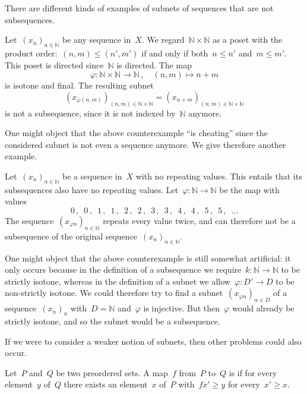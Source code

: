 There are different kinds of examples of subnets of sequences that are not subsequences.
\begin{itemize*}

	\item
		Let~$(x_n)_{n ∈ ℕ}$ be any sequence in~$X$.
		We regard~$ℕ × ℕ$ as a poset with the product order:~$(n, m) ≤ (n', m')$ if and only if both~$n ≤ n'$ and~$m ≤ m'$.
		This poset is directed since~$ℕ$ is directed.
		The map
		\[
			φ \colon ℕ × ℕ \to ℕ \,, \quad (n, m) \mapsto n + m
		\]
		is isotone and final.
		The resulting subnet
		\[
			(x_{φ (n, m)})_{(n, m) ∈ ℕ × ℕ} = (x_{n + m})_{(n, m) ∈ ℕ × ℕ}
		\]
		is not a subsequence, since it is not indexed by~$ℕ$ anymore.

	\item
		One might object that the above counterexample \enquote{is cheating} since the considered subnet is not even a sequence anymore.
		We give therefore another example.

		Let~$(x_n)_{n ∈ ℕ}$ be a sequence in~$X$ with no repeating values.
		This entails that its subsequences also have no repeating values.
		Let~$φ \colon ℕ \to ℕ$ be the map with values
		\[
			0 \,, \enspace 0 \,, \enspace
			1 \,, \enspace 1 \,, \enspace
			2 \,, \enspace 2 \,, \enspace
			3 \,, \enspace 3 \,, \enspace
			4 \,, \enspace 4 \,, \enspace
			5 \,, \enspace 5 \,, \enspace
			\dotsc
		\]
		The sequence~$(x_{φ n})_{n ∈ ℕ}$ repeats every value twice, and can therefore not be a subsequence of the original sequence~$(x_n)_{n ∈ ℕ}$.

	\item
		One might object that the above counterexample is still somewhat artificial:
		it only occurs because in the definition of a subsequence we require~$k \colon ℕ \to ℕ$ to be strictly isotone, whereas in the definition of a subnet we allow~$φ \colon D' \to D$ to be non-strictly isotone.
		We could therefore try to find a subnet~$(x_{φ α})_{α ∈ D}$ of a sequence~$(x_n)_n$ with~$D = ℕ$ and~$φ$ is injective.
		But then~$φ$ would already be strictly isotone, and so the subnet would be a subsequence.

\end{itemize*}

If we were to consider a weaker notion of subnets, then other problems could also occur.

\begin{definition}
	Let~$P$ and~$Q$ be two preordered sets.
	A map~$f$ from~$P$ to~$Q$ is  if for every element~$y$ of~$Q$ there exists an element~$x$ of~$P$ with~$f x' ≥ y$ for every~$x' ≥ x$.
\end{definition}

